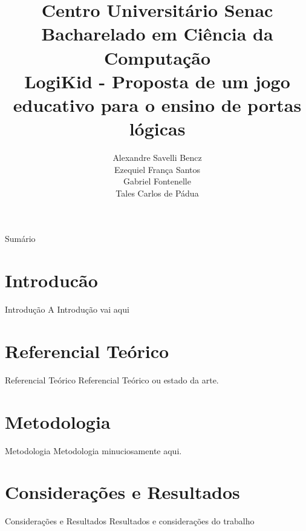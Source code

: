 \documentclass[handout,t]{beamer}
\title[LogiKid - Proposta de um jogo educativo para o ensino de portas lógicas]{Centro Universitário Senac\\Bacharelado em Ciência da Computação\\LogiKid - Proposta de um jogo educativo para o ensino de portas lógicas}
\date{}
\author[Projeto Integrador II - Bacharelado em Ciência da Computação]{Alexandre Savelli Bencz\\ Ezequiel França Santos\\ Gabriel Fontenelle\\ Tales Carlos de Pádua\\}
\begin{document}

\frame{\titlepage}
\section[]{}
\begin{frame}{Sumário}
  \tableofcontents
\end{frame}


\section{Introducão}
\begin{frame}{Introdução}
A Introdução vai aqui
\end{frame}

\section{Referencial Teórico}
\begin{frame}{Referencial Teórico}
Referencial Teórico ou estado da arte.  
\end{frame}

\section{Metodologia}
\begin{frame}{Metodologia}
Metodologia minuciosamente aqui.
\end{frame}

\section{Considerações e Resultados}
\begin{frame}{Considerações e Resultados}
Resultados e considerações do trabalho  
\end{frame}
\end{document}
